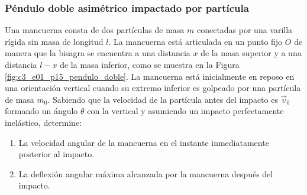 \subsubsection{Péndulo doble asimétrico impactado por partícula}

Una mancuerna consta de dos partículas de masa $m$ conectadas por una varilla rígida sin masa de longitud $l$. La mancuerna está articulada en un punto fijo $O$ de manera que la bisagra se encuentra a una distancia $x$ de la masa superior y a una distancia $l - x$ de la masa inferior, como se muestra en la Figura \ref{fig:c3_e01_p15_pendulo_doble}. La mancuerna está inicialmente en reposo en una orientación vertical cuando su extremo inferior es golpeado por una partícula de masa $m_0$. Sabiendo que la velocidad de la partícula antes del impacto es $\vec{v}_0$ formando un ángulo $\theta$ con la vertical y asumiendo un impacto perfectamente inelástico, determine:

\begin{enumerate}
    \item La velocidad angular de la mancuerna en el instante inmediatamente posterior al impacto.
    \item La deflexión angular máxima alcanzada por la mancuerna después del impacto.
\end{enumerate}

